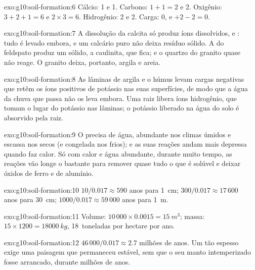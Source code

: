 \begin{solution}{exo:g10:soil-formation:6}
Cálcio: 1 e 1. Carbono: $1 + 1 = 2$ e 2. Oxigênio: $3 + 2 + 1 = 6$ e
$2 \times 3 = 6$. Hidrogênio: 2 e 2. Carga: 0, e $+2 - 2 = 0$.
\end{solution}

\begin{solution}{exo:g10:soil-formation:7}
A dissolução da calcita só produz íons dissolvidos,  e
: tudo é levado embora, e um calcário puro não deixa resíduo
sólido. A  do feldspato produz um sólido, a caulinita, que fica; e
o quartzo do granito quase não reage. O granito deixa, portanto, argila e
areia.
\end{solution}

\begin{solution}{exo:g10:soil-formation:8}
As lâminas de argila e o húmus levam cargas negativas que retêm os íons
positivos de potássio  nas suas superfícies, de modo que a água da
chuva que passa não os leva embora. Uma raiz libera íons hidrogênio, que
tomam o lugar do potássio nas lâminas; o potássio liberado na água do solo é
absorvido pela raiz.
\end{solution}

\begin{solution}{exo:g10:soil-formation:9}
O  precisa de água, abundante nos climas úmidos e
escassa nos secos (e congelada nos frios); e as suas reações andam mais
depressa quando faz calor. Só com calor e água abundante, durante muito
tempo, as reações vão longe o bastante para remover quase tudo o que é
solúvel e deixar óxidos de ferro e de alumínio.
\end{solution}

\begin{solution}{exo:g10:soil-formation:10}
$10/0.017 \approx 590$ anos para \qty{1}{cm}; $300/0.017 \approx 17\,600$
anos para \qty{30}{cm}; $1000/0.017 \approx 59\,000$ anos para \qty{1}{m}.
\end{solution}

\begin{solution}{exo:g10:soil-formation:11}
Volume: $10\,000 \times 0.0015 = \qty{15}{m^3}$; massa: $15 \times 1200 =
\qty{18000}{kg}$, \num{18}~toneladas por hectare por ano.
\end{solution}

\begin{solution}{exo:g10:soil-formation:12}
$46\,000/0.017 \approx 2.7$ milhões de anos. Um  tão espesso exige
uma paisagem que permaneceu estável, sem que o seu manto intemperizado fosse
arrancado, durante milhões de anos.
\end{solution}

